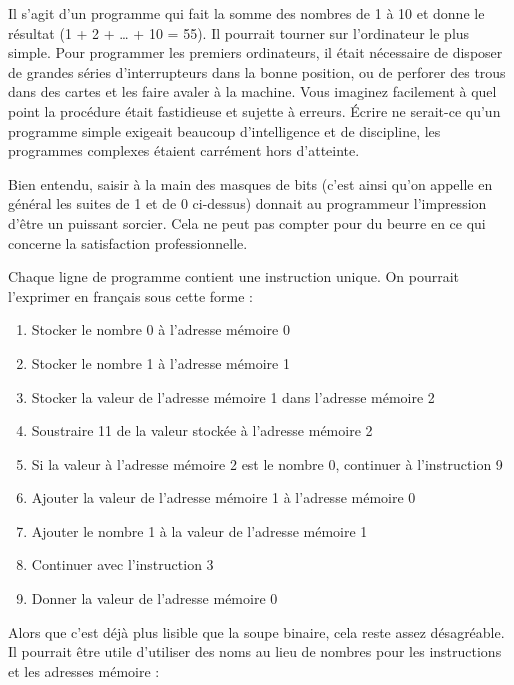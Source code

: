 \documentclass{FramateX}
\begin{document}
Il s'agit d'un programme qui fait la somme des nombres de 1 à 10 et
donne le résultat (1 + 2 + \ldots{} + 10 = 55). Il pourrait tourner sur
l'ordinateur le plus simple. Pour programmer les premiers ordinateurs,
il était nécessaire de disposer de grandes séries d'interrupteurs dans
la bonne position, ou de perforer des trous dans des cartes et les faire
avaler à la machine. Vous imaginez facilement à quel point la procédure
était fastidieuse et sujette à erreurs. Écrire ne serait-ce qu'un
programme simple exigeait beaucoup d'intelligence et de discipline, les
programmes complexes étaient carrément hors d'atteinte.

Bien entendu, saisir à la main des masques de bits (c'est ainsi qu'on
appelle en général les suites de 1 et de 0 ci-dessus) donnait au
programmeur l'impression d'être un puissant sorcier. Cela ne peut pas
compter pour du beurre en ce qui concerne la satisfaction
professionnelle.

Chaque ligne de programme contient une instruction unique. On pourrait
l'exprimer en français sous cette forme :

\begin{enumerate}
\item
  Stocker le nombre 0 à l'adresse mémoire 0
\item
  Stocker le nombre 1 à l'adresse mémoire 1
\item
  Stocker la valeur de l'adresse mémoire 1 dans l'adresse mémoire 2
\item
  Soustraire 11 de la valeur stockée à l'adresse mémoire 2
\item
  Si la valeur à l'adresse mémoire 2 est le nombre 0, continuer à
  l'instruction 9
\item
  Ajouter la valeur de l'adresse mémoire 1 à l'adresse mémoire 0
\item
  Ajouter le nombre 1 à la valeur de l'adresse mémoire 1
\item
  Continuer avec l'instruction 3
\item
  Donner la valeur de l'adresse mémoire 0
\end{enumerate}
Alors que c'est déjà plus lisible que la soupe binaire, cela reste assez
désagréable. Il pourrait être utile d'utiliser des noms au lieu de
nombres pour les instructions et les adresses mémoire :
\end{document}
